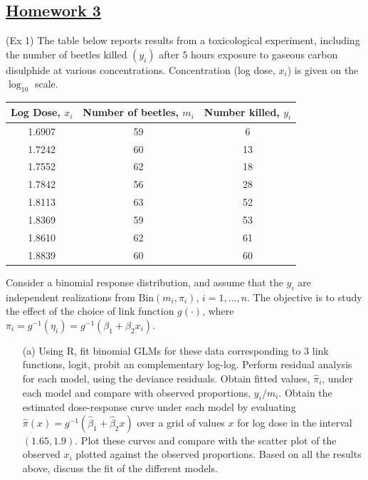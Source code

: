 \documentclass[]{article}
\begin{document}
\renewcommand{\headrulewidth}{0.4pt}
\renewcommand{\footrulewidth}{0.4pt}


\begin{center}
\section*{\underline{Homework 3}}
\end{center}

\begin{enumerate}  \Large{
		\item (Ex 1)
		The table below reports results from a toxicological experiment, including the number of beetles killed $(y_i)$ after $5$ hours exposure to gaseous carbon disulphide at various concentrations. Concentration (log dose, $x_i$) is given on the $\log_{10}$ scale.\\
		\begin{table}[ht]
			\centering
			\begin{tabular}{ccc}
				\hline
				Log Dose, $x_i$ & Number of beetles, $m_i$ & Number killed, $y_i$ \\
				\hline
				1.6907 & 59 & 6 \\
				1.7242 & 60 & 13 \\
				1.7552 & 62 & 18 \\
				1.7842 & 56 & 28 \\
				1.8113 & 63 & 52 \\
				1.8369 & 59 & 53 \\
				1.8610 & 62 & 61 \\
				1.8839 & 60 & 60 \\
				\hline
			\end{tabular}
		\end{table}
        Consider a binomial response distribution, and assume that the $y_i$ are independent realizations from $\mathrm{Bin}(m_i,\pi_i)$, $i = 1,\ldots,n$. The objective is to study the effect of the choice of link function $g(\cdot)$, where $\pi_i = g^{-1}(\eta_i) = g^{-1}(\beta_1 + \beta_2x_i)$.\\
        \begin{itemize}
        	\item[(a)] Using R, fit binomial GLMs for these data corresponding to 3 link functions, logit, probit an complementary log-log. Perform residual analysis for each model, using the deviance residuals. Obtain fitted values, $\hat{\pi}_i$, under each model and compare with observed proportions, $y_i/m_i$. Obtain the estimated dose-response curve under each model by evaluating $\hat{\pi}(x) = g^{-1}(\hat{\beta}_1 + \hat{\beta}_2x)$ over a grid of values $x$ for log dose in the interval $(1.65,1.9)$. Plot these curves and compare with the scatter plot of the observed $x_i$ plotted against the observed proportions. Based on all the results above, discuss the fit of the different models.

\end{itemize}}
\end{enumerate}
\end{document}
